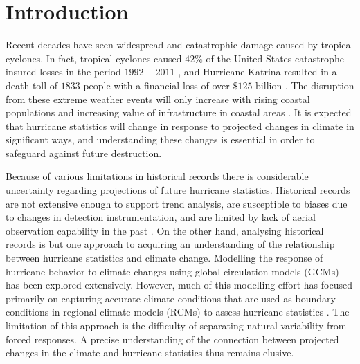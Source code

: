 


\begin{abstract}
\end{abstract}

\section{Introduction}
\label{intro}
\par
Recent decades have seen widespread and catastrophic damage caused by tropical cyclones. In fact, tropical cyclones caused $42\%$ of the United States catastrophe-insured losses in the period $1992-2011$ \cite{tc_reanal:1}, and Hurricane Katrina resulted in a death toll of $1833$ people with a financial loss of over $\$125$ billion \cite{tc_reanal:1}. The disruption from these extreme weather events will only increase with rising coastal populations and increasing value of infrastructure in coastal areas \cite{kerry_tc_clim}. It is expected that hurricane statistics will change in response to projected changes in climate in significant ways, and understanding these changes is essential in order to safeguard against future destruction. 
\par
Because of various limitations in historical records there is considerable uncertainty regarding projections of future hurricane statistics. Historical records are not extensive enough to support trend analysis, are susceptible to biases due to changes in detection instrumentation, and are limited by lack of aerial observation capability in the past \cite{kerry_clivar}. On the other hand, analysing historical records is but one approach to acquiring an understanding of the relationship between hurricane statistics and climate change. Modelling the response of hurricane behavior to climate changes using global circulation models (GCMs) has been explored extensively. However, much of this modelling effort has focused primarily on capturing accurate climate conditions that are used as boundary conditions in regional climate models (RCMs) to assess hurricane statistics \cite{kerry_clivar}. The limitation of this approach is the difficulty of separating natural variability from forced responses. A precise understanding of the connection between projected changes in the climate and hurricane statistics thus remains elusive. 
